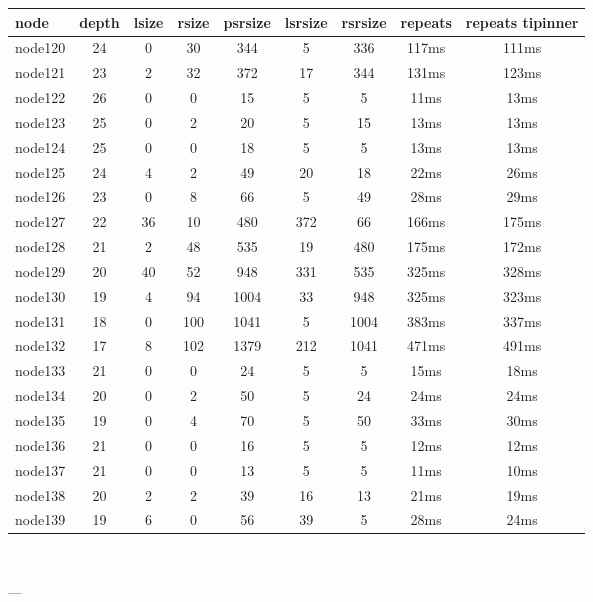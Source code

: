 \begin{tabular}{|l|c|c|c|c|c|c|c|c|}
\hline node & depth & lsize & rsize & psrsize & lsrsize & rsrsize   & repeats & repeats tipinner\\
    \hline node120 & 24 & 0 & 30 & 344 & 5 & 336 & 117ms & 111ms\\
    \hline node121 & 23 & 2 & 32 & 372 & 17 & 344 & 131ms & 123ms\\
    \hline node122 & 26 & 0 & 0 & 15 & 5 & 5 & 11ms & 13ms\\
    \hline node123 & 25 & 0 & 2 & 20 & 5 & 15 & 13ms & 13ms\\
    \hline node124 & 25 & 0 & 0 & 18 & 5 & 5 & 13ms & 13ms\\
    \hline node125 & 24 & 4 & 2 & 49 & 20 & 18 & 22ms & 26ms\\
    \hline node126 & 23 & 0 & 8 & 66 & 5 & 49 & 28ms & 29ms\\
    \hline node127 & 22 & 36 & 10 & 480 & 372 & 66 & 166ms & 175ms\\
    \hline node128 & 21 & 2 & 48 & 535 & 19 & 480 & 175ms & 172ms\\
    \hline node129 & 20 & 40 & 52 & 948 & 331 & 535 & 325ms & 328ms\\
    \hline node130 & 19 & 4 & 94 & 1004 & 33 & 948 & 325ms & 323ms\\
    \hline node131 & 18 & 0 & 100 & 1041 & 5 & 1004 & 383ms & 337ms\\
    \hline node132 & 17 & 8 & 102 & 1379 & 212 & 1041 & 471ms & 491ms\\
    \hline node133 & 21 & 0 & 0 & 24 & 5 & 5 & 15ms & 18ms\\
    \hline node134 & 20 & 0 & 2 & 50 & 5 & 24 & 24ms & 24ms\\
    \hline node135 & 19 & 0 & 4 & 70 & 5 & 50 & 33ms & 30ms\\
    \hline node136 & 21 & 0 & 0 & 16 & 5 & 5 & 12ms & 12ms\\
    \hline node137 & 21 & 0 & 0 & 13 & 5 & 5 & 11ms & 10ms\\
    \hline node138 & 20 & 2 & 2 & 39 & 16 & 13 & 21ms & 19ms\\
    \hline node139 & 19 & 6 & 0 & 56 & 39 & 5 & 28ms & 24ms\\

\hline
\end{tabular} \

---


